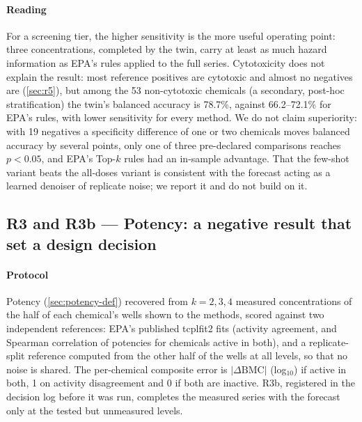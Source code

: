 \documentclass[11pt,a4paper]{article}
\newcommand{\nNeg}{19}
\begin{document}
\paragraph{Reading}
For a screening tier, the higher sensitivity is the more useful operating point: three concentrations,
completed by the twin, carry at least as much hazard information as EPA's rules applied to the full series.
Cytotoxicity does not explain the result: most reference positives are cytotoxic and almost no negatives are
(\cref{sec:r5}), but among the 53 non-cytotoxic chemicals (a secondary, post-hoc
stratification) the twin's balanced accuracy is 78.7\%, against
66.2--72.1\% for
EPA's rules, with lower sensitivity for every method. We do not claim superiority: with \nNeg{} negatives a specificity difference of one or two
chemicals moves balanced accuracy by several points, only one of three pre-declared comparisons reaches
\(p<0.05\), and EPA's Top-\(k\) rules had an in-sample advantage. That the few-shot variant beats the all-doses
variant is consistent with the forecast acting as a learned denoiser of replicate noise; we report it and do not
build on it.

\subsection{R3 and R3b --- Potency: a negative result that set a design decision}\label{sec:r3}

\paragraph{Protocol}
Potency (\cref{sec:potency-def}) recovered from \(k=2,3,4\) measured concentrations of the half of each chemical's
wells shown to the methods, scored against two independent references: EPA's published tcplfit2 fits (activity
agreement, and Spearman correlation of potencies for chemicals active in both), and a replicate-split reference
computed from the other half of the wells at all levels, so that no noise is shared. The per-chemical composite
error is \(|\Delta\mathrm{BMC}|\) (log\(_{10}\)) if active in both, 1 on activity disagreement and 0 if both are
inactive. R3b, registered in the decision log before it was run, completes the measured series with the forecast
only at the tested but unmeasured levels.
\end{document}

